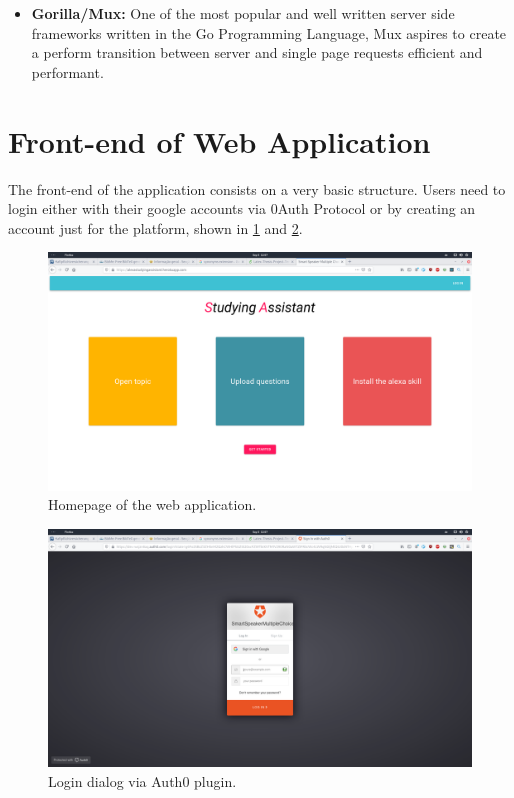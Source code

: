 \begin{itemize}
\item \textbf{Gorilla/Mux:} One of the most popular and well written server side 
    frameworks written in the Go Programming Language, Mux aspires to create a perform
    transition between server and single page requests efficient and performant.

\end{itemize}


\section{Front-end of Web Application}
The front-end of the application consists on a very basic structure. Users need to login
either with their google accounts via 0Auth Protocol or by creating an account just 
for the platform, shown in \ref{fig:homepage} and \ref{fig:login}.

\begin{figure}
  \centering
  \includegraphics[width=.9\linewidth]{images/app/asa/homepage.png}
  \caption{Homepage of the web application.}
  \label{fig:homepage}
 \end{figure}
 
 \begin{figure}
  \centering
  \includegraphics[width=.9\linewidth]{images/app/asa/auth0.png}
  \caption{Login dialog via Auth0 plugin.}
  \label{fig:login}
 \end{figure}


